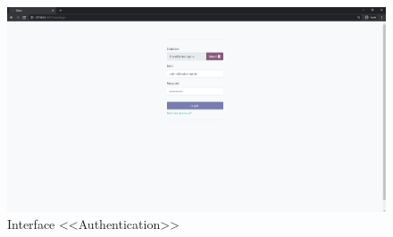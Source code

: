\begin{figure}[H]
    \centering
    \includegraphics[scale=0.30]{img/c_auth.png}
    \caption{Interface <<Authentication>>}
    \label{fig:my_label}
\end{figure}

